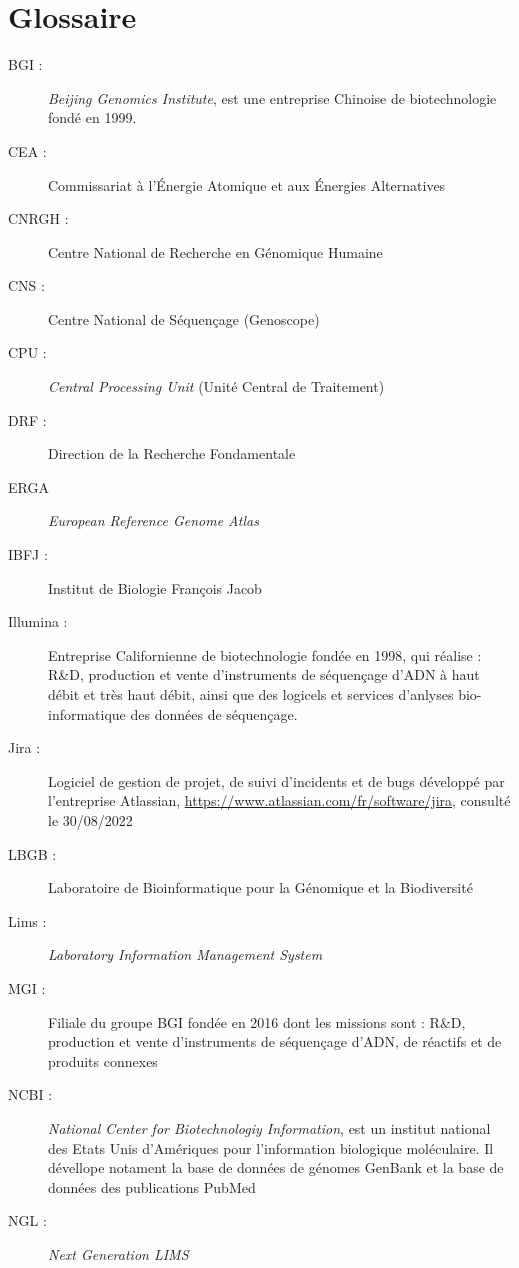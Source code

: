 \section*{Glossaire}

\begin{description}
    \item[BGI : ] \emph{Beijing Genomics Institute}, est une entreprise Chinoise de biotechnologie fondé en 1999.
    \item[CEA :] Commissariat à l'Énergie Atomique et aux Énergies Alternatives
    \item[CNRGH :] Centre National de Recherche en Génomique Humaine 
    \item[CNS :] Centre National de Séquençage (Genoscope)
    \item[CPU :] \emph{Central Processing Unit} (Unité Central de Traitement)
    \item[DRF :] Direction de la Recherche Fondamentale
    \item[ERGA] \emph{European Reference Genome Atlas}
    \item[IBFJ :] Institut de Biologie François Jacob
    \item[Illumina :] Entreprise Californienne de biotechnologie fondée en 1998, qui réalise : R\&D, production et vente d’instruments de séquençage d’ADN à haut débit et très haut débit, ainsi que des logicels et services d'anlyses bio-informatique des données de séquençage.
    \item[Jira :] Logiciel de gestion de projet, de suivi d'incidents et de bugs développé par l'entreprise Atlassian, \href{https://www.atlassian.com/fr/software/jira}{https://www.atlassian.com/fr/software/jira}, consulté le 30/08/2022
    \item[LBGB :] Laboratoire de Bioinformatique pour la Génomique et la Biodiversité
    \item[Lims :] \emph{Laboratory Information Management System}
    \item[MGI : ] Filiale du groupe BGI fondée en 2016 dont les missions sont : R\&D, production et vente d’instruments de séquençage 
    d’ADN, de réactifs et de produits connexes
    \item[NCBI :] \emph{National Center for Biotechnologiy Information}, est un institut national des Etats Unis d'Amériques pour l'information biologique moléculaire. Il dévellope notament la base de données de génomes GenBank et la base de données des publications PubMed
    \item[NGL :] \emph{Next Generation LIMS}

\end{description}
